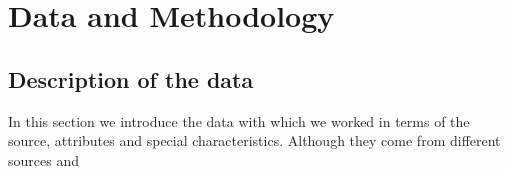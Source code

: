 \chapter{Data and Methodology}
\label{ch:intro}

\section{Description of the data}
In this section we introduce the data with which we worked in terms of the source, attributes and special characteristics. Although they come from different sources and 